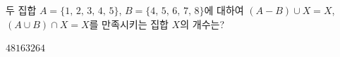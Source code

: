 두 집합 $A=\{1,\,2,\,3,\,4,\,5\}$, $B=\{4,\,5,\,6,\,7,\,8\}$에 대하여 $(A-B)\cup X=X$, $(A\cup B)\cap X=X$를 만족시키는 집합 $X$의 개수는?
\begin{choices32}{$4$}{$8$}{$16$}{$32$}{$64$}\end{choices32}
